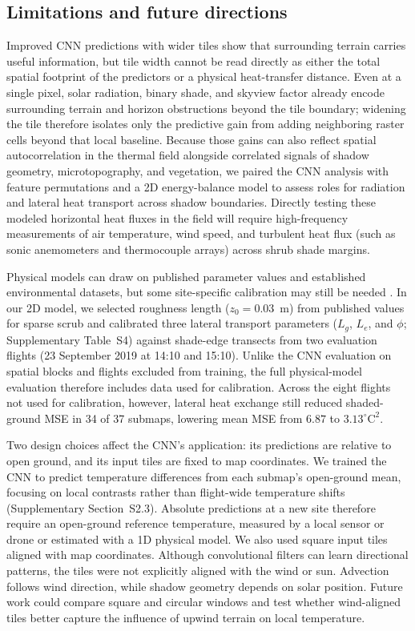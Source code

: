 \documentclass[12pt]{article}
\begin{document}
\subsection{Limitations and future directions}

\noindent Improved CNN predictions with wider tiles show that surrounding terrain carries useful information, but tile width cannot be read directly as either the total spatial footprint of the predictors or a physical heat-transfer distance. Even at a single pixel, solar radiation, binary shade, and skyview factor already encode surrounding terrain and horizon obstructions beyond the tile boundary; widening the tile therefore isolates only the predictive gain from adding neighboring raster cells beyond that local baseline. Because those gains can also reflect spatial autocorrelation in the thermal field alongside correlated signals of shadow geometry, microtopography, and vegetation, we paired the CNN analysis with feature permutations and a 2D energy-balance model to assess roles for radiation and lateral heat transport across shadow boundaries. Directly testing these modeled horizontal heat fluxes in the field will require high-frequency measurements of air temperature, wind speed, and turbulent heat flux (such as sonic anemometers and thermocouple arrays) across shrub shade margins.

Physical models can draw on published parameter values and established environmental datasets, but some site-specific calibration may still be needed \citep{briscoe_2023}. In our 2D model, we selected roughness length ($z_0 = 0.03$~m) from published values for sparse scrub \citep{oke_1987} and calibrated three lateral transport parameters ($L_g$, $L_e$, and $\phi$; Supplementary Table~S4) against shade-edge transects from two evaluation flights (23 September 2019 at 14:10 and 15:10). Unlike the CNN evaluation on spatial blocks and flights excluded from training, the full physical-model evaluation therefore includes data used for calibration. Across the eight flights not used for calibration, however, lateral heat exchange still reduced shaded-ground MSE in 34 of 37 submaps, lowering mean MSE from $6.87$ to $3.13^{\circ}\mathrm{C}^2$.

Two design choices affect the CNN's application: its predictions are relative to open ground, and its input tiles are fixed to map coordinates. We trained the CNN to predict temperature differences from each submap's open-ground mean, focusing on local contrasts rather than flight-wide temperature shifts (Supplementary Section~S2.3). Absolute predictions at a new site therefore require an open-ground reference temperature, measured by a local sensor or drone or estimated with a 1D physical model. We also used square input tiles aligned with map coordinates. Although convolutional filters can learn directional patterns, the tiles were not explicitly aligned with the wind or sun. Advection follows wind direction, while shadow geometry depends on solar position. Future work could compare square and circular windows and test whether wind-aligned tiles better capture the influence of upwind terrain on local temperature.
\end{document}
